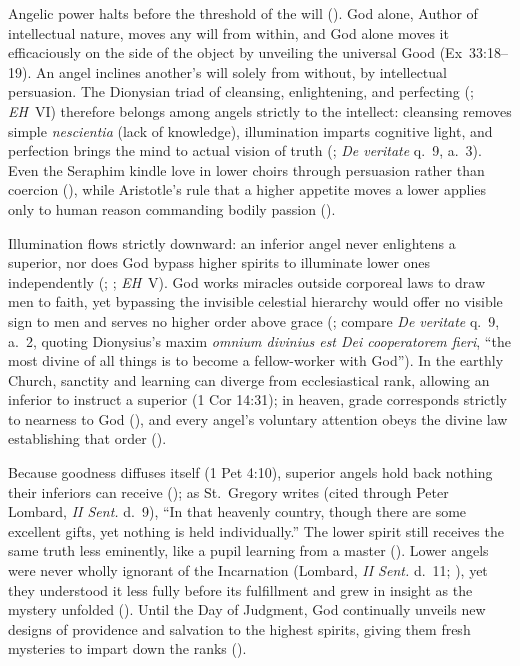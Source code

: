 Angelic power halts before the threshold of the will (). God alone, Author of intellectual nature, moves any will from within, and God alone moves it efficaciously on the side of the object by unveiling the universal Good (Ex~33:18--19). An angel inclines another's will solely from without, by intellectual persuasion. The Dionysian triad of cleansing, enlightening, and perfecting (; \emph{EH}~VI) therefore belongs among angels strictly to the intellect: cleansing removes simple \emph{nescientia} (lack of knowledge), illumination imparts cognitive light, and perfection brings the mind to actual vision of truth (; \emph{De veritate} q.~9, a.~3). Even the Seraphim kindle love in lower choirs through persuasion rather than coercion (), while Aristotle's rule that a higher appetite moves a lower applies only to human reason commanding bodily passion ().

Illumination flows strictly downward: an inferior angel never enlightens a superior, nor does God bypass higher spirits to illuminate lower ones independently (; ; \emph{EH}~V). God works miracles outside corporeal laws to draw men to faith, yet bypassing the invisible celestial hierarchy would offer no visible sign to men and serves no higher order above grace (; compare \emph{De veritate} q.~9, a.~2, quoting Dionysius's maxim \emph{omnium divinius est Dei cooperatorem fieri}, ``the most divine of all things is to become a fellow-worker with God''). In the earthly Church, sanctity and learning can diverge from ecclesiastical rank, allowing an inferior to instruct a superior (1 Cor 14:31); in heaven, grade corresponds strictly to nearness to God (), and every angel's voluntary attention obeys the divine law establishing that order ().

Because goodness diffuses itself (1 Pet 4:10), superior angels hold back nothing their inferiors can receive (); as St.~Gregory writes (cited through Peter Lombard, \emph{II Sent.} d.~9), ``In that heavenly country, though there are some excellent gifts, yet nothing is held individually.'' The lower spirit still receives the same truth less eminently, like a pupil learning from a master (). Lower angels were never wholly ignorant of the Incarnation (Lombard, \emph{II Sent.} d.~11; ), yet they understood it less fully before its fulfillment and grew in insight as the mystery unfolded (). Until the Day of Judgment, God continually unveils new designs of providence and salvation to the highest spirits, giving them fresh mysteries to impart down the ranks ().

